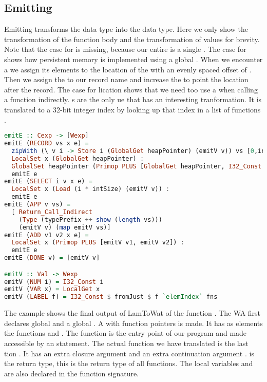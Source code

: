 {\subsection{\label{section:emit}Emitting}
Emitting transforms the  data type into the  data type. Here we only show the transformation of the function body  and the transformation of values  for brevity. Note that the case for  is missing, because our entire  is a single . The case for  shows how persistent memory is implemented using a global . When we encounter a  we assign its elements  to the location of the  with an evenly spaced offset of . Then we assign the  to our record name and increase the  to point the location after the record. The case for lication shows that we need too use a  when calling a function indirectly. s are the only ue that has an interesting tranformation. It is translated to a 32-bit integer index by looking up that index in a list of functions .

\begin{lstlisting}[language=Haskell]
emitE :: Cexp -> [Wexp]
emitE (RECORD vs x e) =
  zipWith (\ v i -> Store i (GlobalGet heapPointer) (emitV v)) vs [0,intSize..] ++
  LocalSet x (GlobalGet heapPointer) :
  GlobalSet heapPointer (Primop PLUS [GlobalGet heapPointer, I32_Const (length vs * intSize)]) :
  emitE e
emitE (SELECT i v x e) =
  LocalSet x (Load (i * intSize) (emitV v)) :
  emitE e
emitE (APP v vs) =
  [ Return_Call_Indirect
    (Type (typePrefix ++ show (length vs)))
    (emitV v) (map emitV vs)]
emitE (ADD v1 v2 x e) =
  LocalSet x (Primop PLUS [emitV v1, emitV v2]) :
  emitE e
emitE (DONE v) = [emitV v]

emitV :: Val -> Wexp
emitV (NUM i) = I32_Const i
emitV (VAR x) = LocalGet x
emitV (LABEL f) = I32_Const $ fromJust $ f `elemIndex` fns
\end{lstlisting}

The example shows the final output of LamToWat of the function . The \ac{WA}  first declares global  and a global . A  with function pointers is made. It has as elements the functions  and . The  function is the entry point of our program and made accessible by an  statement. The actual function we have translated is the last tion . It has an extra closure argument  and an extra continuation argument .  is the return type, this is the return type of all functions. The local variables  and  are also declared in the function signature.

}
